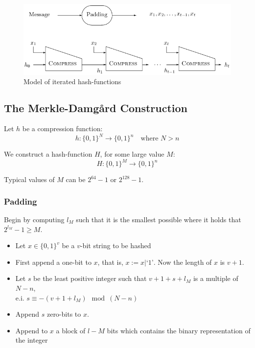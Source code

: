 \begin{figure}[H]
  \begin{centering}
    \includegraphics[width=12cm]{images/10-it-hash}
    \caption{Model of iterated hash-functions}
  \end{centering}
\end{figure}


\subsection{The Merkle-Damgård Construction}
Let $h$ be a compression function:
\[ h: \{0,1\}^N \rightarrow \{0,1\}^n \quad \text{where } N > n \]

We construct a hash-function $H$, for some large value $M$:
\[ H: \{0,1\}^M \rightarrow \{0,1\}^n \]

Typical values of $M$ can be $2^{64}-1$ or $2^{128}-1$.

\subsubsection*{Padding}
Begin by computing $l_M$ such that it is the smallest possible where
it holds that $2^{l_M} -1 \ge M$.
\begin{itemize}
\item Let $x \in \{0,1\}^v$ be a $v$-bit string to be hashed
\item First append a one-bit to $x$, that is, $x := x | ‘1’$. Now the length of $x$ is $v + 1$.
\item Let $s$ be the least positive integer such that $v + 1 + s +
  l_M$ is a multiple of $N - n$,\\ e.i. $s \equiv - (v + 1 + l_M) \mod
  (N-n)$
\item Append $s$ zero-bits to $x$.
\item Append to $x$ a block of $l-M$ bits which contains the binary representation of the integer
\end{itemize}

